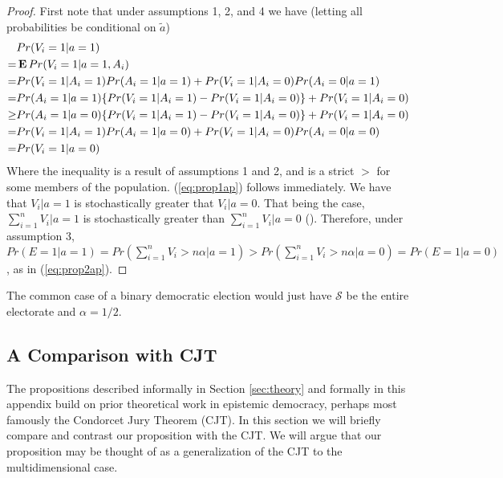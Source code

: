 \documentclass[11pt]{article}
\newcommand{\E}{\mathop{\bf E\/}}
\begin{document}
\begin{proof}
First note that
under assumptions 1, 2, and 4 we have (letting all probabilities be conditional on $\tilde{a}$)
\begin{align*}
&Pr(V_i=1|a=1)\\
=&\E Pr(V_i=1|a=1,A_i)\\
=&Pr(V_i=1|A_i=1)Pr(A_i=1|a=1)+Pr(V_i=1|A_i=0)Pr(A_i=0|a=1)\\
=&Pr(A_i=1|a=1)\{Pr(V_i=1|A_i=1)-Pr(V_i=1|A_i=0)\}+Pr(V_i=1|A_i=0)\\
\ge&Pr(A_i=1|a=0)\{Pr(V_i=1|A_i=1)-Pr(V_i=1|A_i=0)\}+Pr(V_i=1|A_i=0)\\
=&Pr(V_i=1|A_i=1)Pr(A_i=1|a=0)+Pr(V_i=1|A_i=0)Pr(A_i=0|a=0)\\
=&Pr(V_i=1|a=0)
\end{align*}
Where the inequality is a result of assumptions 1 and 2, and is a strict $>$ for some members of the population.
(\ref{eq:prop1ap}) follows immediately.
We have that $V_i|a=1$ is stochastically greater that $V_i|a=0$. That being the case, $\sum_{i=1}^n V_i |a=1$ is stochastically greater than $\sum_{i=1}^n V_i |a=0$ (\citet{shaked2007stochastic}).
Therefore, under assumption 3, $Pr(E=1|a=1)=Pr(\sum_{i=1}^n V_i
>n\alpha|a=1)>Pr(\sum_{i=1}^n V_i>n\alpha |a=0)=Pr(E=1|a=0)$, as in (\ref{eq:prop2ap}).
\end{proof}

\noindent The common case of a binary democratic election would just have
 $\mathcal{S}$ be the entire electorate and $\alpha=1/2$.

\subsection{A Comparison with CJT}\label{sec:cjt-compare}

The propositions described informally in Section \ref{sec:theory} and formally in this appendix build on prior theoretical work in epistemic democracy, perhaps most famously the Condorcet Jury Theorem (CJT).
In this section we will briefly compare and contrast our proposition with the CJT.
We will argue that our proposition may be thought of as a generalization of the CJT to the multidimensional case.
\end{document}
